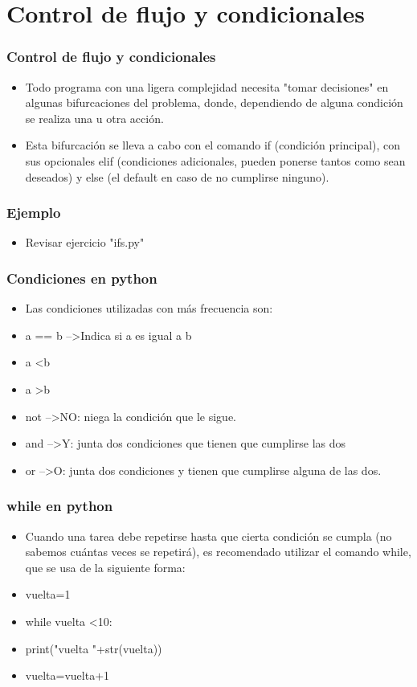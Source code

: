 \documentclass[hyperref={pdfpagelabels=false},xcolor=pst,pdf,fragile]{beamer}
\begin{document}
\section{Control de flujo y condicionales}
\begin{frame}
    \frametitle{Control de flujo y condicionales}
    \pause
    \begin{itemize}
    \item Todo programa con una ligera complejidad necesita "tomar decisiones" en algunas bifurcaciones del problema, donde, dependiendo de alguna condición se realiza una u otra acción.
    \item Esta bifurcación se lleva a cabo con el comando if (condición principal), con sus opcionales elif (condiciones adicionales, pueden ponerse tantos como sean deseados) y else (el default en caso de no cumplirse ninguno).
    \end{itemize}
\end{frame}

\begin{frame}
    \frametitle{Ejemplo}
    \pause
    \begin{itemize}
    \item Revisar ejercicio "ifs.py"
    \end{itemize}
\end{frame}

\begin{frame}
    \frametitle{Condiciones en python}
    \pause
    \begin{itemize}
    \item Las condiciones utilizadas con más frecuencia son:
    \item a == b –\textgreater Indica si a es igual a b
    \item a \textless b
    \item a \textgreater b
    \item not –\textgreater NO: niega la condición que le sigue.
    \item and –\textgreater Y: junta dos condiciones que tienen que cumplirse las dos
    \item or –\textgreater O: junta dos condiciones y tienen que cumplirse alguna de las dos.
    \end{itemize}
\end{frame}

\begin{frame}
    \frametitle{while en python}
    \pause
    \begin{itemize}
    \item Cuando una tarea debe repetirse hasta que cierta condición se cumpla (no sabemos cuántas veces se repetirá), es recomendado utilizar el comando while, que se usa de la siguiente forma:
    \item vuelta=1
    \item while vuelta \textless 10:
    \item \quad \quad \quad print("vuelta "+str(vuelta))
    \item \quad \quad \quad vuelta=vuelta+1
    \end{itemize}
\end{frame}
\end{document}
